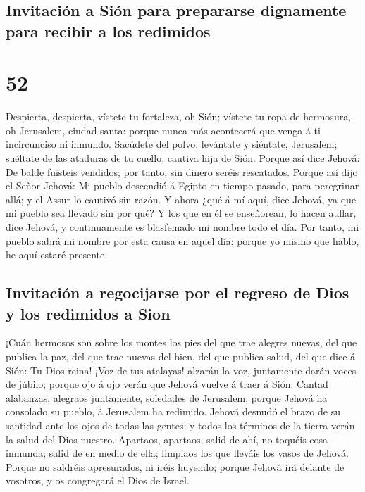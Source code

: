 \hypertarget{invitaciuxf3n-a-siuxf3n-para-prepararse-dignamente-para-recibir-a-los-redimidos}{%
\subsection{Invitación a Sión para prepararse dignamente para recibir a
los
redimidos}\label{invitaciuxf3n-a-siuxf3n-para-prepararse-dignamente-para-recibir-a-los-redimidos}}

\hypertarget{section-51}{%
\section{52}\label{section-51}}

 Despierta, despierta, vístete tu fortaleza, oh Sión;
vístete tu ropa de hermosura, oh Jerusalem, ciudad santa: porque nunca
más acontecerá que venga á ti incircunciso ni inmundo. 
Sacúdete del polvo; levántate y siéntate, Jerusalem; suéltate de las
ataduras de tu cuello, cautiva hija de Sión.  Porque así
dice Jehová: De balde fuisteis vendidos; por tanto, sin dinero seréis
rescatados.  Porque así dijo el Señor Jehová: Mi pueblo
descendió á Egipto en tiempo pasado, para peregrinar allá; y el Assur lo
cautivó sin razón.  Y ahora ¿qué á mí aquí, dice Jehová, ya
que mi pueblo sea llevado sin por qué? Y los que en él se enseñorean, lo
hacen aullar, dice Jehová, y continuamente es blasfemado mi nombre todo
el día.  Por tanto, mi pueblo sabrá mi nombre por esta causa
en aquel día: porque yo mismo que hablo, he aquí estaré presente.

\hypertarget{invitaciuxf3n-a-regocijarse-por-el-regreso-de-dios-y-los-redimidos-a-sion}{%
\subsection{Invitación a regocijarse por el regreso de Dios y los
redimidos a
Sion}\label{invitaciuxf3n-a-regocijarse-por-el-regreso-de-dios-y-los-redimidos-a-sion}}

 ¡Cuán hermosos son sobre los montes los pies del que trae
alegres nuevas, del que publica la paz, del que trae nuevas del bien,
del que publica salud, del que dice á Sión: Tu Dios reina! 
¡Voz de tus atalayas! alzarán la voz, juntamente darán voces de júbilo;
porque ojo á ojo verán que Jehová vuelve á traer á Sión. 
Cantad alabanzas, alegraos juntamente, soledades de Jerusalem: porque
Jehová ha consolado su pueblo, á Jerusalem ha redimido. 
Jehová desnudó el brazo de su santidad ante los ojos de todas las
gentes; y todos los términos de la tierra verán la salud del Dios
nuestro.  Apartaos, apartaos, salid de ahí, no toquéis cosa
inmunda; salid de en medio de ella; limpiaos los que lleváis los vasos
de Jehová.  Porque no saldréis apresurados, ni iréis
huyendo; porque Jehová irá delante de vosotros, y os congregará el Dios
de Israel.

